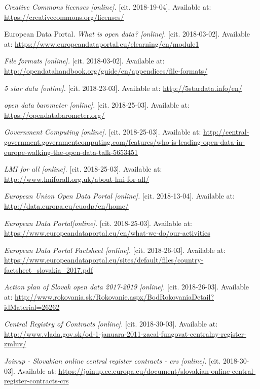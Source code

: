 \documentclass[thesis=B,english]{FITthesis}[2012/06/26]
\begin{document}
{\begin{thebibliography}{9}
\textit{Creative Commons licenses [online].}
[cit. 2018-19-04]. Available at: \url{https://creativecommons.org/licenses/}

European Data Portal.
\textit{What is open data? [online].}
[cit. 2018-03-02]. Available at: \url{https://www.europeandataportal.eu/elearning/en/module1} 

\textit{File formats [online].}
[cit. 2018-03-02]. Available at: \url{http://opendatahandbook.org/guide/en/appendices/file-formats/} 

\textit{5 star data [online].}
[cit. 2018-23-03]. Available at: \url{http://5stardata.info/en/} 

\textit{open data barometer [online].}
[cit. 2018-25-03]. Available at: \url{https://opendatabarometer.org/}

\textit{Government Computing [online].}
[cit. 2018-25-03]. Available at: \url{http://central-government.governmentcomputing.com/features/who-is-leading-open-data-in-europe-walking-the-open-data-talk-5653451}

\textit{LMI for all [online].}
[cit. 2018-25-03]. Available at: \url{http://www.lmiforall.org.uk/about-lmi-for-all/}

\textit{European Union Open Data Portal [online].}
[cit. 2018-13-04]. Available at: \url{http://data.europa.eu/euodp/en/home/}

\textit{European Data Portal[online].}
[cit. 2018-25-03]. Available at: \url{https://www.europeandataportal.eu/en/what-we-do/our-activities}

\textit{European Data Portal Factsheet [online].}
[cit. 2018-26-03]. Available at: \url{https://www.europeandataportal.eu/sites/default/files/country-factsheet_slovakia_2017.pdf}

\textit{Action plan of Slovak open data 2017-2019 [online].}
[cit. 2018-26-03]. Available at: \url{http://www.rokovania.sk/Rokovanie.aspx/BodRokovaniaDetail?idMaterial=26262}

\textit{Central Registry of Contracts [online].}
[cit. 2018-30-03]. Available at: \url{http://www.vlada.gov.sk/od-1-januara-2011-zacal-fungovat-centralny-register-zmluv/}

\textit{Joinup - Slovakian online central register contracts - crs [online].}
[cit. 2018-30-03]. Available at: \url{https://joinup.ec.europa.eu/document/slovakian-online-central-register-contracts-crs}


\end{thebibliography}}
\end{document}

